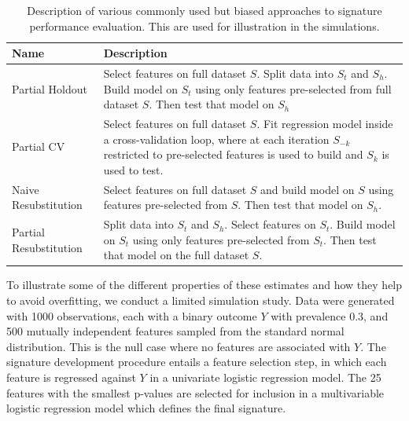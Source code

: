 \documentclass[11pt,]{article}
\begin{document}
\begin{table}
\caption{Description of various commonly used but biased approaches to signature performance evaluation. This are used for illustration in the simulations. \label{descript} }
\begin{center}
\begin{tabular}[!ht]{l|p{3in}}
Name & Description \\
\hline
Partial Holdout & Select features on full dataset $S$. Split data into $S_t$ and $S_h$. Build model on $S_t$ using only features pre-selected from full dataset $S$. Then test that model on $S_h$ \\
Partial CV  & Select features on full dataset $S$. Fit regression model inside a cross-validation loop, where at each iteration $S_{-k}$ restricted to pre-selected features is used to build and $S_k$ is used to test. \\
Naive Resubstitution & Select features on full dataset $S$ and build model on $S$ using features pre-selected from $S$. Then test that model on $S_h$. \\
Partial Resubstitution & Split data into $S_t$ and $S_h$. Select features on $S_t$. Build model on $S_t$ using only features pre-selected from $S_t$. Then test that model on the full dataset $S$. \\
\end{tabular}
\end{center}
\end{table}

To illustrate some of the different properties of these estimates and
how they help to avoid overfitting, we conduct a limited simulation
study. Data were generated with 1000 observations, each with a binary
outcome \(Y\) with prevalence 0.3, and 500 mutually independent features
sampled from the standard normal distribution. This is the null case
where no features are associated with \(Y\). The signature development
procedure entails a feature selection step, in which each feature is
regressed against \(Y\) in a univariate logistic regression model. The
25 features with the smallest p-values are selected for inclusion in a
multivariable logistic regression model which defines the final
signature.
\end{document}
